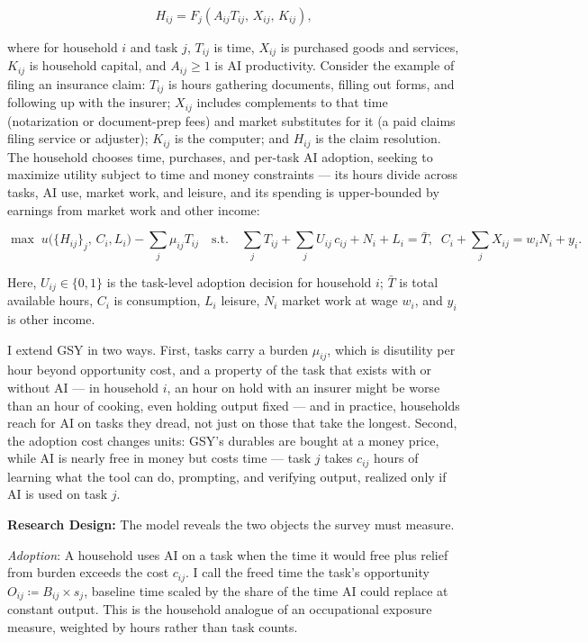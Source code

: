 \documentclass[11pt]{article}
\begin{document}
\begin{equation}
H_{ij} = F_j\!\left(A_{ij}T_{ij},\, X_{ij},\, K_{ij}\right),
\end{equation}

where for household $i$ and task $j$, $T_{ij}$ is time, $X_{ij}$ is purchased goods and services, $K_{ij}$ is household capital, and $A_{ij}\geq 1$ is AI productivity. Consider the example of filing an insurance claim: $T_{ij}$ is hours gathering documents, filling out forms, and following up with the insurer; $X_{ij}$ includes complements to that time (notarization or document-prep fees) and market substitutes for it (a paid claims filing service or adjuster); $K_{ij}$ is the computer; and $H_{ij}$ is the claim resolution. The household chooses time, purchases, and per-task AI adoption, seeking to maximize utility subject to time and money constraints — its hours divide across tasks, AI use, market work, and leisure, and its spending is upper-bounded by earnings from market work and other income:

\begin{equation}
\max\; u\big(\{H_{ij}\}_j,\, C_i, L_i\big) - \textstyle\sum_j \mu_{ij}T_{ij} \quad \text{s.t.} \quad \textstyle\sum_j T_{ij} + \sum_j U_{ij}\,c_{ij} + N_i + L_i = \bar{T}, \;\; C_i + \sum_j X_{ij} = w_i N_i + y_i.
\end{equation}

Here, $U_{ij}\in\{0,1\}$ is the task-level adoption decision for household $i$; $\bar{T}$ is total available hours, $C_i$ is consumption, $L_i$ leisure, $N_i$ market work at wage $w_i$, and $y_i$ is other income.

I extend GSY in two ways. First, tasks carry a burden $\mu_{ij}$, which is disutility per hour beyond opportunity cost, and a property of the task that exists with or without AI — in household $i$, an hour on hold with an insurer might be worse than an hour of cooking, even holding output fixed — and in practice, households reach for AI on tasks they dread, not just on those that take the longest. Second, the adoption cost changes units: GSY's durables are bought at a money price, while AI is nearly free in money but costs time — task $j$ takes $c_{ij}$ hours of learning what the tool can do, prompting, and verifying output, realized only if AI is used on task $j$.

\smallskip
\noindent\textbf{Research Design:} The model reveals the two objects the survey must measure. 

\textit{Adoption}: A household uses AI on a task when the time it would free plus relief from burden exceeds the cost $c_{ij}$. I call the freed time the task's opportunity $O_{ij} \coloneqq B_{ij} \times s_j$, baseline time scaled by the share of the time AI could replace at constant output. This is the household analogue of an occupational exposure measure, weighted by hours rather than task counts.
\end{document}
